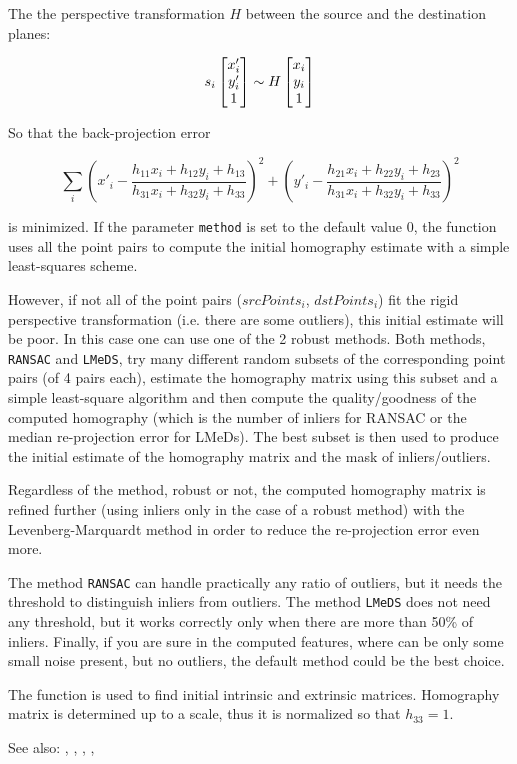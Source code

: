 The  the perspective transformation $H$ between the source and the destination planes:

\[
s_i \begin{bmatrix} x'_i\\ y'_i\\ 1 \end{bmatrix} \sim H \begin{bmatrix} x_i\\ y_i\\ 1 \end{bmatrix}
\]

So that the back-projection error

\[
\sum_i
\left( x'_i-\frac{h_{11} x_i + h_{12} y_i + h_{13}}{h_{31} x_i + h_{32} y_i + h_{33}} \right)^2+
\left( y'_i-\frac{h_{21} x_i + h_{22} y_i + h_{23}}{h_{31} x_i + h_{32} y_i + h_{33}} \right)^2
\]

is minimized. If the parameter \texttt{method} is set to the default value 0, the function
uses all the point pairs to compute the initial homography estimate with a simple least-squares scheme.

However, if not all of the point pairs ($srcPoints_i$,
$dstPoints_i$) fit the rigid perspective transformation (i.e. there
are some outliers), this initial estimate will be poor.
In this case one can use one of the 2 robust methods. Both methods,
\texttt{RANSAC} and \texttt{LMeDS}, try many different random subsets
of the corresponding point pairs (of 4 pairs each), estimate
the homography matrix using this subset and a simple least-square
algorithm and then compute the quality/goodness of the computed homography
(which is the number of inliers for RANSAC or the median re-projection
error for LMeDs). The best subset is then used to produce the initial
estimate of the homography matrix and the mask of inliers/outliers.

Regardless of the method, robust or not, the computed homography
matrix is refined further (using inliers only in the case of a robust
method) with the Levenberg-Marquardt method in order to reduce the
re-projection error even more.

The method \texttt{RANSAC} can handle practically any ratio of outliers,
but it needs the threshold to distinguish inliers from outliers.
The method \texttt{LMeDS} does not need any threshold, but it works
correctly only when there are more than 50\% of inliers. Finally,
if you are sure in the computed features, where can be only some
small noise present, but no outliers, the default method could be the best
choice.

The function is used to find initial intrinsic and extrinsic matrices.
Homography matrix is determined up to a scale, thus it is normalized so that
$h_{33}=1$.

See also: , , , , 

